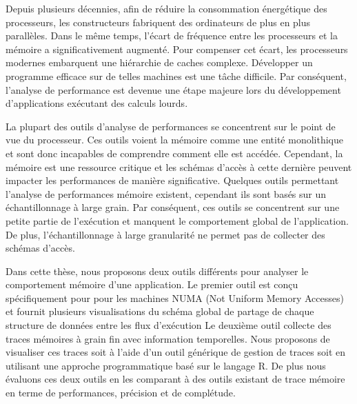 
Depuis plusieurs décennies, afin de réduire la consommation énergétique des processeurs, les constructeurs fabriquent des ordinateurs de plus en plus parallèles.
Dans le même temps, l'écart de fréquence entre les processeurs et la mémoire a significativement augmenté.
Pour compenser cet écart, les processeurs modernes embarquent une hiérarchie de caches complexe.
Développer un programme efficace sur de telles machines est une t\^ache difficile.
Par conséquent, l'analyse de performance est devenue une étape majeure lors du développement d'applications exécutant des calculs lourds.

La plupart des outils d'analyse de performances se concentrent sur le point de vue du processeur.
Ces outils voient la mémoire comme une entité monolithique et sont donc incapables de comprendre comment elle est accédée.
Cependant, la mémoire est une ressource critique et les schémas d'accès à cette dernière peuvent impacter les performances de manière significative.
Quelques outils permettant l'analyse de performances mémoire existent, cependant ils sont basés sur un échantillonnage à large grain.
Par conséquent, ces outils se concentrent sur une petite partie de l'exécution et manquent le comportement global de l'application.
De plus, l'échantillonnage à large granularité ne permet pas de collecter des schémas d'accès.

Dans cette thèse, nous proposons deux outils différents pour analyser le comportement mémoire d'une application.
Le premier outil est conçu spécifiquement pour pour les machines NUMA (Not Uniform Memory Accesses) et fournit plusieurs visualisations  du schéma global de partage de chaque structure de données entre les flux d'exécution
Le deuxième outil collecte des traces mémoires à grain fin avec information temporelles.
Nous proposons de visualiser ces traces soit à l'aide d'un outil générique de gestion de traces soit en utilisant une approche programmatique basé sur le langage R.
De plus nous évaluons ces deux outils en les comparant à des outils existant de trace mémoire en terme de performances, précision et de complétude.

\glsresetall
